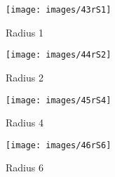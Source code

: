 \begin{figure}%
\centering 
\texttt{[image: images/43rS1]} 
\caption{Radius 1}
\label{fig:43rS1} 
\end{figure}
\begin{figure}%
\centering 
\texttt{[image: images/44rS2]} 
\caption{Radius 2}
\label{fig:44rS2} 
\end{figure}
\begin{figure}%
\centering 
\texttt{[image: images/45rS4]}
\caption{Radius 4}
\label{fig:45rS4} 
\end{figure}
\begin{figure}%
\centering 
\texttt{[image: images/46rS6]} 
\caption{Radius 6}
\label{fig:46rS6} 
\end{figure}